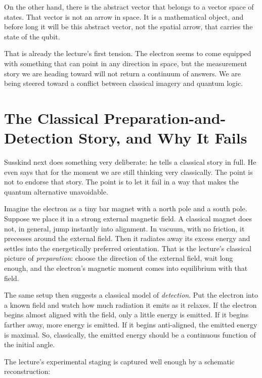On the other hand, there is the abstract vector that belongs to a vector space of states. That vector is not an arrow in space. It is a mathematical object, and before long it will be this abstract vector, not the spatial arrow, that carries the state of the qubit.

That is already the lecture's first tension. The electron seems to come equipped with something that can point in any direction in space, but the measurement story we are heading toward will not return a continuum of answers. We are being steered toward a conflict between classical imagery and quantum logic.

\section{The Classical Preparation-and-Detection Story, and Why It Fails}

Susskind next does something very deliberate: he tells a classical story in full. He even says that for the moment we are still thinking very classically. The point is not to endorse that story. The point is to let it fail in a way that makes the quantum alternative unavoidable.

Imagine the electron as a tiny bar magnet with a north pole and a south pole. Suppose we place it in a strong external magnetic field. A classical magnet does not, in general, jump instantly into alignment. In vacuum, with no friction, it precesses around the external field. Then it radiates away its excess energy and settles into the energetically preferred orientation. That is the lecture's classical picture of \emph{preparation}: choose the direction of the external field, wait long enough, and the electron's magnetic moment comes into equilibrium with that field.

The same setup then suggests a classical model of \emph{detection}. Put the electron into a known field and watch how much radiation it emits as it relaxes. If the electron begins almost aligned with the field, only a little energy is emitted. If it begins farther away, more energy is emitted. If it begins anti-aligned, the emitted energy is maximal. So, classically, the emitted energy should be a continuous function of the initial angle.

The lecture's experimental staging is captured well enough by a schematic reconstruction:

